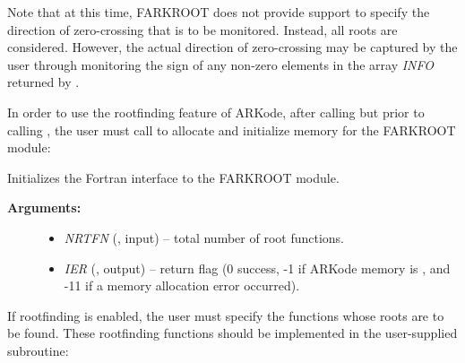 \documentclass[letterpaper,10pt,english]{sphinxmanual}
\begin{document}
Note that at this time, FARKROOT does not provide support to specify
the direction of zero-crossing that is to be monitored.  Instead, all
roots are considered.  However, the actual direction of zero-crossing
may be captured by the user through monitoring the sign of any
non-zero elements in the array \emph{INFO} returned by
{\hyperref[f_interface/Rootfinding:f/_/FARKROOTINFO]{\emph{}}}.

In order to use the rootfinding feature of ARKode, after calling {\hyperref[f_interface/Usage:f/_/FARKMALLOC]{\emph{}}} but prior to
calling {\hyperref[f_interface/Usage:f/_/FARKODE]{\emph{}}}, the user must call
{\hyperref[f_interface/Rootfinding:f/_/FARKROOTINIT]{\emph{}}} to allocate and initialize memory for the FARKROOT module:

\begin{fulllineitems}
\label{f_interface/Rootfinding:f/_/FARKROOTINIT}
Initializes the Fortran interface to the FARKROOT module.
\begin{description}
\item[{\textbf{Arguments:}}] \leavevmode\begin{itemize}
\item {} 
\emph{NRTFN} (, input) -- total number of root functions.

\item {} 
\emph{IER} (, output) -- return flag (0 success, -1 if
ARKode memory is , and -11 if a memory allocation
error occurred).

\end{itemize}

\end{description}

\end{fulllineitems}


If rootfinding is enabled, the user must specify the functions whose
roots are to be found.  These rootfinding functions should be
implemented in the user-supplied {\hyperref[f_interface/Rootfinding:f/_/FARKROOTFN]{\emph{}}} subroutine:
\end{document}
